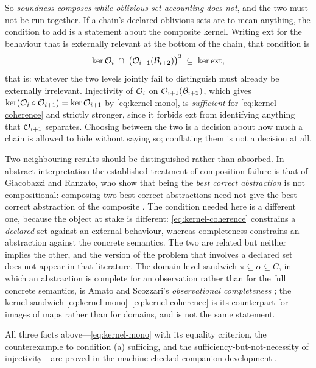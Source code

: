 \begin{remark}
So \emph{soundness composes while oblivious-set accounting does not}, and the two must not be run
together. If a chain's declared oblivious sets are to mean anything, the condition to add is a
statement about the composite kernel. Writing $\mathrm{ext}$ for the behaviour that is externally
relevant at the bottom of the chain, that condition is
\begin{equation}\label{eq:kernel-coherence}
\ker \mathcal{O}_i \;\cap\; \bigl(\mathcal{O}_{i+1}(\mathcal{B}_{i+2})\bigr)^{2} \;\subseteq\; \ker \mathrm{ext},
\end{equation}
that is: whatever the two levels jointly fail to distinguish must already be externally irrelevant.
Injectivity of $\mathcal{O}_i$ on $\mathcal{O}_{i+1}(\mathcal{B}_{i+2})$, which gives
$\ker(\mathcal{O}_i \circ \mathcal{O}_{i+1}) = \ker\mathcal{O}_{i+1}$ by \eqref{eq:kernel-mono}, is \emph{sufficient} for
\eqref{eq:kernel-coherence} and strictly stronger, since it forbids $\mathrm{ext}$ from identifying
anything that $\mathcal{O}_{i+1}$ separates. Choosing between the two is a decision about how much a chain
is allowed to hide without saying so; conflating them is not a decision at all.

Two neighbouring results should be distinguished rather than absorbed. In abstract interpretation the
established treatment of composition failure is that of Giacobazzi and Ranzato, who show that being
the \emph{best correct abstraction} is not compositional: composing two best correct abstractions need
not give the best correct abstraction of the composite \cite{giacobazzi2025}. The condition needed here
is a different one, because the object at stake is different: \eqref{eq:kernel-coherence} constrains a
\emph{declared} set against an external behaviour, whereas completeness constrains an abstraction
against the concrete semantics. The two are related but neither implies the other, and the version of
the problem that involves a declared set does not appear in that literature. The domain-level sandwich
$\pi \subseteq \alpha \subseteq C$, in which an abstraction is complete for an observation rather than
for the full concrete semantics, is Amato and Scozzari's \emph{observational completeness}
\cite{amato2011}; the kernel sandwich \eqref{eq:kernel-mono}--\eqref{eq:kernel-coherence} is its
counterpart for images of maps rather than for domains, and is not the same statement.

All three facts above---\eqref{eq:kernel-mono} with its equality criterion, the counterexample to
condition (a) sufficing, and the sufficiency-but-not-necessity of injectivity---are proved in the
machine-checked companion development \cite{assaylean}.
\end{remark}

